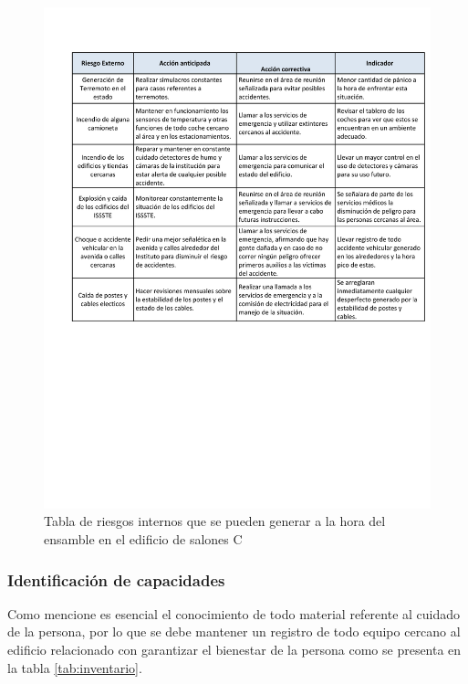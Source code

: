     \begin{figure}[H]
        \centering
        \includegraphics[trim = {1mm 100mm 1mm 10mm},clip,scale=0.35]{19/Img/accionAntiExt.pdf}
        \caption{Tabla de riesgos internos que se pueden generar a la hora del ensamble en el edificio de salones C}
        \label{fig:accionAntiExt}
    \end{figure}
     
     \subsubsection{Identificación de capacidades}

Como mencione es esencial el conocimiento de todo material referente al cuidado de la persona, por lo que se debe mantener un registro de todo equipo cercano al edificio relacionado con garantizar el bienestar de la persona como se presenta en la tabla \ref{tab:inventario}.


